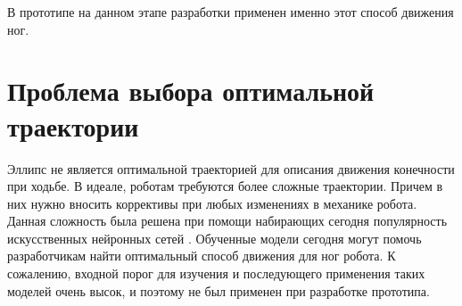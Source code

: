 В прототипе на данном этапе разработки применен именно этот способ движения ног.

\section{Проблема выбора оптимальной траектории}

Эллипс не является оптимальной траекторией для описания движения конечности при ходьбе. В идеале, роботам требуются более сложные траектории. Причем в них нужно вносить коррективы при любых изменениях в механике робота. Данная сложность была решена при помощи набирающих сегодня популярность искусственных нейронных сетей \cite{Singla2018}. Обученные модели сегодня могут помочь разработчикам найти оптимальный способ движения для ног робота. К сожалению, входной порог для изучения и последующего применения таких моделей очень высок, и поэтому не был применен при разработке прототипа.